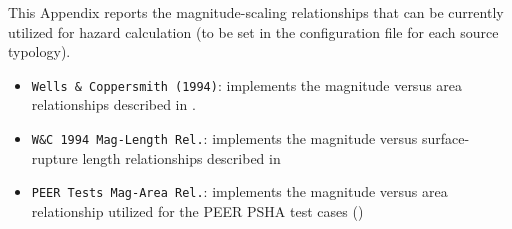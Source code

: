 \label{app:msr}
This Appendix reports the magnitude-scaling relationships that can be currently utilized for hazard calculation (to be set in the configuration file for each source typology).
\begin{itemize}
\item \Verb+Wells & Coppersmith (1994)+: implements the magnitude versus area relationships described in \cite{wells1994}.
\item \Verb+W&C 1994 Mag-Length Rel.+: implements the magnitude versus surface-rupture length relationships described in \cite{wells1994}
\item \Verb+PEER Tests Mag-Area Rel.+: implements the magnitude versus area relationship utilized for the PEER PSHA test cases (\cite{thomas2010})
\end{itemize}
